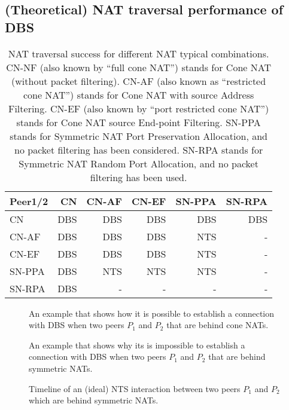 \subsection{(Theoretical) NAT traversal performance of DBS}

\begin{table}
  \centering
  \begin{tabular}{l|r|r|r|r|r}
    Peer1/2 & CN    & CN-AF & CN-EF & SN-PPA & SN-RPA \\
    \hline
    CN      & DBS   & DBS   & DBS   & DBS    & DBS    \\
    CN-AF   & DBS   & DBS   & DBS   & NTS    & -      \\
    CN-EF   & DBS   & DBS   & DBS   & NTS    & -      \\
    SN-PPA  & DBS   & NTS   & NTS   & NTS    & -      \\
    SN-RPA  & DBS   & -     & -     & -      & -
  \end{tabular}
  \caption{NAT traversal success for different NAT typical
    combinations. CN-NF (also known by ``full cone NAT'') stands for
    Cone NAT (without packet filtering). CN-AF (also known as
    ``restricted cone NAT'') stands for Cone NAT with source Address
    Filtering. CN-EF (also known by ``port restricted cone NAT'')
    stands for Cone NAT source End-point Filtering. SN-PPA stands for
    Symmetric NAT Port Preservation Allocation, and no packet
    filtering has been considered. SN-RPA stands for Symmetric NAT
    Random Port Allocation, and no packet filtering has been used.
    \label{tab:theoretical}}
\end{table}

\begin{figure}
  \caption{An example that shows how it is possible to establish a
    connection with DBS when two peers $P_1$ and $P_2$ that are behind
    cone NATs.\label{fig:UDP_Hole_Punching_RCN}}
\end{figure}

\begin{figure}
  \caption{An example that shows why its is impossible to establish a
    connection with DBS when two peers $P_1$ and $P_2$ that are behind
    symmetric NATs.\label{fig:UDP_Hole_Punching_SN_failure}}
\end{figure}

\begin{figure*}
  \caption{Timeline of an (ideal) NTS interaction between two peers
    $P_1$ and $P_2$ which are behind symmetric NATs.
    \label{fig:SNTuCPP}}
\end{figure*}

